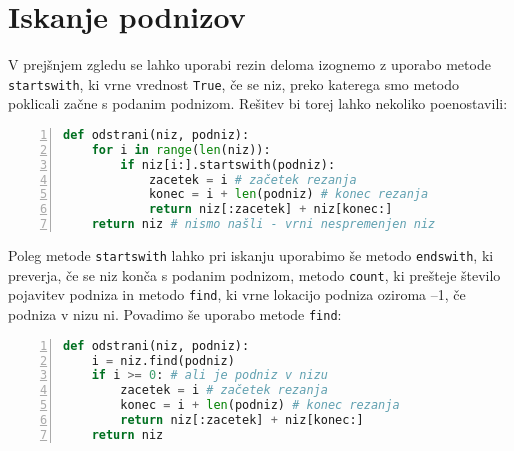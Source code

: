 \section{Iskanje podnizov}
V prejšnjem zgledu se lahko uporabi rezin deloma izognemo z uporabo metode \texttt{startswith}, ki vrne vrednost \texttt{True}, če se niz, preko katerega smo metodo poklicali začne s podanim podnizom. Rešitev bi torej lahko nekoliko poenostavili:
\begin{lstlisting}[language=Python, showstringspaces=false,numbers=left]
def odstrani(niz, podniz):
    for i in range(len(niz)):
        if niz[i:].startswith(podniz):
            zacetek = i # začetek rezanja
            konec = i + len(podniz) # konec rezanja
            return niz[:zacetek] + niz[konec:]
    return niz # nismo našli - vrni nespremenjen niz
\end{lstlisting}
Poleg metode \texttt{startswith} lahko pri iskanju uporabimo še metodo \texttt{endswith}, ki preverja, če se niz konča s podanim podnizom, metodo \texttt{count}, ki prešteje število pojavitev podniza in metodo \texttt{find}, ki vrne lokacijo podniza oziroma --1, če podniza v nizu ni. Povadimo še uporabo metode \texttt{find}:
\begin{lstlisting}[language=Python, showstringspaces=false,numbers=left]
def odstrani(niz, podniz):
    i = niz.find(podniz)
    if i >= 0: # ali je podniz v nizu
        zacetek = i # začetek rezanja
        konec = i + len(podniz) # konec rezanja
        return niz[:zacetek] + niz[konec:]
    return niz
\end{lstlisting}

